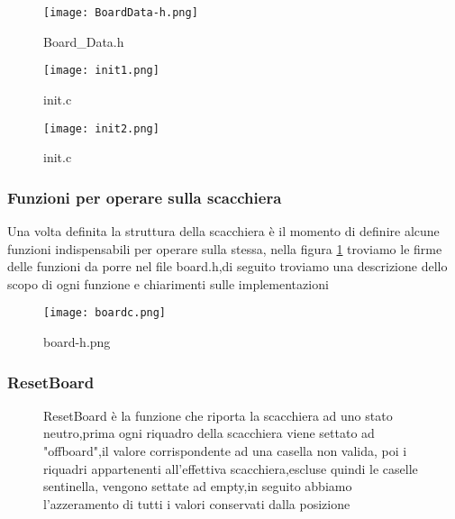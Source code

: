 \begin{figure}
    \centering
    \begin{minipage}{0.3\textwidth}
        \texttt{[image: BoardData-h.png]}
        \caption{Board\_Data.h}
    \end{minipage}
    \hfill
    \begin{minipage}{0.3\textwidth}
        \texttt{[image: init1.png]}
        \caption{init.c}
    \end{minipage}
    \hfill
    \begin{minipage}{0.3\textwidth}
        \texttt{[image: init2.png]}
        \caption{init.c}
    \end{minipage}
\end{figure}



\subsubsection{Funzioni per operare sulla scacchiera}
Una volta definita la struttura della scacchiera è il momento di definire alcune funzioni indispensabili per operare sulla stessa,
nella figura \ref{scacchierah} troviamo le firme delle funzioni da porre nel file board.h,di seguito troviamo una descrizione dello scopo di ogni funzione e chiarimenti sulle implementazioni
\begin{figure}[H]
    \centering
    \texttt{[image: boardc.png]}
    \caption{ board-h.png}
    \label{scacchierah}
\end{figure}


\subsubsection{ResetBoard}
\begin{figure}[H]
    \begin{minipage}[t]{.63\textwidth}
        \centering {}
    \end{minipage}
    \begin{minipage}[t]{0.35\textwidth}
        \large{ResetBoard è la funzione che riporta la scacchiera ad uno stato neutro,prima ogni riquadro della scacchiera viene settato ad "offboard",il valore corrispondente ad una casella non valida,
            poi i riquadri appartenenti all'effettiva scacchiera,escluse quindi le caselle sentinella, vengono settate ad empty,in seguito abbiamo l'azzeramento di tutti i valori conservati dalla posizione}
    \end{minipage}
\end{figure}



